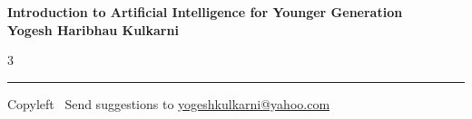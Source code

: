 \documentclass[8pt,landscape]{article}
\begin{document}
\footnotesize


\begin{center}
\Large{\textbf{Introduction to Artificial Intelligence for Younger Generation\\ Yogesh Haribhau Kulkarni}}
\end{center}

\begin{multicols}{3}

\end{multicols}

\rule{\linewidth}{0.25pt}
\scriptsize
Copyleft \textcopyleft\  Send suggestions to
\href{http://www.yogeshkulkarni.com}{yogeshkulkarni@yahoo.com}
\end{document}
